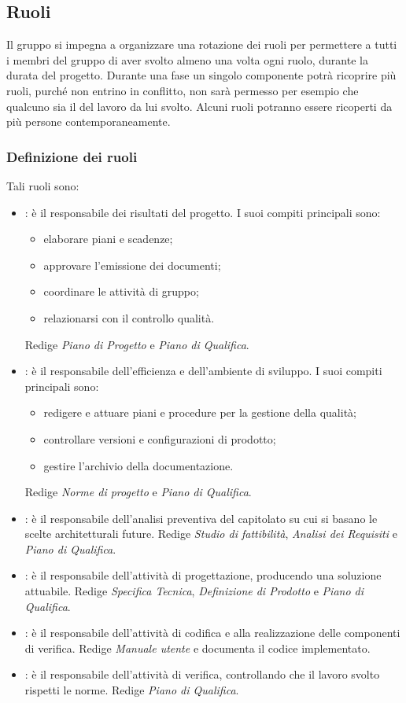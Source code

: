 \subsection{Ruoli}
Il gruppo \GroupName{} si impegna a organizzare una rotazione dei ruoli per permettere a tutti i membri del gruppo di aver svolto almeno una volta ogni ruolo, durante la durata del progetto. Durante una fase un singolo componente potrà ricoprire più ruoli, purché non entrino in conflitto, non sarà permesso per esempio che qualcuno sia il \Verificatore{} del lavoro da lui svolto. Alcuni ruoli potranno essere ricoperti da più persone contemporaneamente.
\subsubsection{Definizione dei ruoli}
Tali ruoli sono:
\begin{itemize}
	\item \Responsabile{}: è il responsabile dei risultati del progetto. I suoi compiti principali sono:
	\begin{itemize}
		\item elaborare piani e scadenze;
		\item approvare l'emissione dei documenti;
		\item coordinare le attività di gruppo;
		\item relazionarsi con il controllo qualità.
	\end{itemize}
	Redige \textit{Piano di Progetto} e \textit{Piano di Qualifica}.
	\item \Amministratore{}: è il responsabile dell'efficienza e dell'ambiente di sviluppo. I suoi compiti principali sono:
	\begin{itemize}
		\item redigere e attuare piani e procedure per la gestione della qualità;
		\item controllare versioni e configurazioni di prodotto;
		\item gestire l'archivio della documentazione.
	\end{itemize}
	Redige \textit{Norme di progetto} e \textit{Piano di Qualifica}.
	\item \Analista{}: è il responsabile dell'analisi preventiva del capitolato su cui si basano le scelte architetturali future.
	Redige \textit{Studio di fattibilità}, \textit{Analisi dei Requisiti} e \textit{Piano di Qualifica}.
	\item \Progettista{}: è il responsabile dell'attività di progettazione, producendo una soluzione attuabile.
	Redige \textit{Specifica Tecnica}, \textit{Definizione di Prodotto} e \textit{Piano di Qualifica}.
	\item \Programmatore{}: è il responsabile dell'attività di codifica e alla realizzazione delle componenti di verifica.
	Redige \textit{Manuale utente} e documenta il codice implementato.
	\item \Verificatore{}: è il responsabile dell'attività di verifica, controllando che il lavoro svolto rispetti le norme.
	Redige \textit{Piano di Qualifica}.
\end{itemize}
